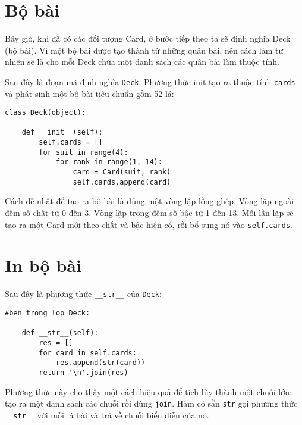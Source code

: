 \documentclass[11pt]{book}
\begin{document}
\section{Bộ bài}

Bây giờ, khi đã có các đối tượng Card, ở bước tiếp theo ta sẽ định nghĩa Deck (bộ bài). 
Vì một bộ bài được tạo thành từ những quân bài, nên cách làm tự nhiên sẽ là 
cho mỗi Deck chứa một danh sách các quân bài làm thuộc tính.


Sau đây là đoạn mã định nghĩa {\tt Deck}. Phương thức init
tạo ra thuộc tính {\tt cards} và phát sinh một bộ bài tiêu chuẩn
gồm 52 lá:



\beforeverb
\begin{verbatim}
class Deck(object):

    def __init__(self):
        self.cards = []
        for suit in range(4):
            for rank in range(1, 14):
                card = Card(suit, rank)
                self.cards.append(card)
\end{verbatim}
\afterverb
%
Cách dễ nhất để tạo ra bộ bài là dùng một vòng lặp lồng ghép. Vòng lặp
ngoài đếm số chất từ 0 đến 3. Vòng lặp trong đếm số bậc từ 1 đến 13.
Mỗi lần lặp sẽ tạo ra một Card mới theo chất và bậc hiện có, rồi bổ sung
nó vào  {\tt self.cards}.



\section{In bộ bài}
\label{printdeck}


Sau đây là phương thức \verb"__str__" của {\tt Deck}:

\beforeverb
\begin{verbatim}
#ben trong lop Deck:

    def __str__(self):
        res = []
        for card in self.cards:
            res.append(str(card))
        return '\n'.join(res)
\end{verbatim}
\afterverb
%
Phương thức này cho thấy một cách hiệu quả để tích lũy thành
một chuỗi lớn: tạo ra một danh sách các chuỗi rồi dùng {\tt join}.
Hàm có sẵn {\tt str} gọi phương thức \verb"__str__"
với mỗi lá bài và trả về chuỗi biểu diễn của nó.
\end{document}
